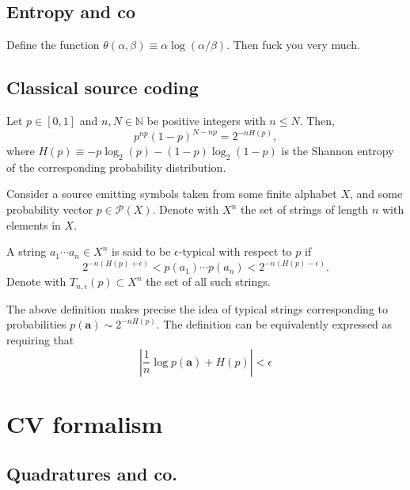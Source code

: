 \documentclass[12pt]{report}
\newcommand{\NN}{\mathbb{N}}
\newcommand{\bs}[1]{\boldsymbol{#1}}
\newcommand{\calP}{{\mathcal{P}}}
\begin{document}
\section{Entropy and co}

Define the function $\theta(\alpha,\beta)\equiv \alpha\log(\alpha/\beta)$. Then fuck you very much.

\section{Classical source coding}

\begin{prop}
	Let $p\in[0,1]$ and $n,N\in\NN$ be positive integers with $n\le N$.
	Then,
	\begin{equation}
		p^{np} (1-p)^{N-np}
		= 2^{-nH(p)},
	\end{equation}
	where $H(p)\equiv -p\log_2(p)-(1-p)\log_2(1-p)$ is the Shannon entropy of the corresponding probability distribution.
\end{prop}

Consider a source emitting symbols taken from some finite alphabet $X$, and some probability vector $p\in \calP(X)$.
Denote with $X^n$ the set of strings of length $n$ with elements in $X$.

\begin{defn}
	A string $a_1\cdots a_n\in X^n$ is said to be $\epsilon$-typical with respect to $p$ if
	\begin{equation}
		2^{-n(H(p)+\epsilon)} < p(a_1)\cdots p(a_n) < 2^{-n(H(p)-\epsilon)}.
	\end{equation}
	Denote with $T_{n,\epsilon}(p)\subset X^n$ the set of all such strings.
\end{defn}

The above definition makes precise the idea of typical strings corresponding to probabilities $p(\bs a)\sim 2^{-nH(p)}$.
The definition can be equivalently expressed as requiring that
\begin{equation}
	\left\lvert \frac{1}{n}\log p(\bs a) + H(p) \right\rvert < \epsilon
\end{equation}

\chapter{CV formalism}
\minitoc

\section{Quadratures and co.}
\end{document}
